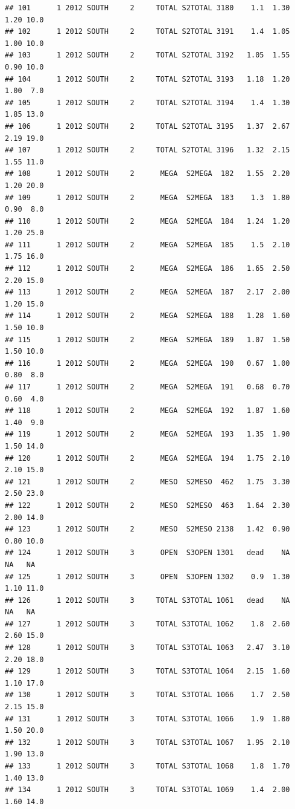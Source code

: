 \documentclass[
]{article}
\begin{document}
\begin{verbatim}
## 101      1 2012 SOUTH     2     TOTAL S2TOTAL 3180    1.1  1.30  1.20 10.0
## 102      1 2012 SOUTH     2     TOTAL S2TOTAL 3191    1.4  1.05  1.00 10.0
## 103      1 2012 SOUTH     2     TOTAL S2TOTAL 3192   1.05  1.55  0.90 10.0
## 104      1 2012 SOUTH     2     TOTAL S2TOTAL 3193   1.18  1.20  1.00  7.0
## 105      1 2012 SOUTH     2     TOTAL S2TOTAL 3194    1.4  1.30  1.85 13.0
## 106      1 2012 SOUTH     2     TOTAL S2TOTAL 3195   1.37  2.67  2.19 19.0
## 107      1 2012 SOUTH     2     TOTAL S2TOTAL 3196   1.32  2.15  1.55 11.0
## 108      1 2012 SOUTH     2      MEGA  S2MEGA  182   1.55  2.20  1.20 20.0
## 109      1 2012 SOUTH     2      MEGA  S2MEGA  183    1.3  1.80  0.90  8.0
## 110      1 2012 SOUTH     2      MEGA  S2MEGA  184   1.24  1.20  1.20 25.0
## 111      1 2012 SOUTH     2      MEGA  S2MEGA  185    1.5  2.10  1.75 16.0
## 112      1 2012 SOUTH     2      MEGA  S2MEGA  186   1.65  2.50  2.20 15.0
## 113      1 2012 SOUTH     2      MEGA  S2MEGA  187   2.17  2.00  1.20 15.0
## 114      1 2012 SOUTH     2      MEGA  S2MEGA  188   1.28  1.60  1.50 10.0
## 115      1 2012 SOUTH     2      MEGA  S2MEGA  189   1.07  1.50  1.50 10.0
## 116      1 2012 SOUTH     2      MEGA  S2MEGA  190   0.67  1.00  0.80  8.0
## 117      1 2012 SOUTH     2      MEGA  S2MEGA  191   0.68  0.70  0.60  4.0
## 118      1 2012 SOUTH     2      MEGA  S2MEGA  192   1.87  1.60  1.40  9.0
## 119      1 2012 SOUTH     2      MEGA  S2MEGA  193   1.35  1.90  1.50 14.0
## 120      1 2012 SOUTH     2      MEGA  S2MEGA  194   1.75  2.10  2.10 15.0
## 121      1 2012 SOUTH     2      MESO  S2MESO  462   1.75  3.30  2.50 23.0
## 122      1 2012 SOUTH     2      MESO  S2MESO  463   1.64  2.30  2.00 14.0
## 123      1 2012 SOUTH     2      MESO  S2MESO 2138   1.42  0.90  0.80 10.0
## 124      1 2012 SOUTH     3      OPEN  S3OPEN 1301   dead    NA    NA   NA
## 125      1 2012 SOUTH     3      OPEN  S3OPEN 1302    0.9  1.30  1.10 11.0
## 126      1 2012 SOUTH     3     TOTAL S3TOTAL 1061   dead    NA    NA   NA
## 127      1 2012 SOUTH     3     TOTAL S3TOTAL 1062    1.8  2.60  2.60 15.0
## 128      1 2012 SOUTH     3     TOTAL S3TOTAL 1063   2.47  3.10  2.20 18.0
## 129      1 2012 SOUTH     3     TOTAL S3TOTAL 1064   2.15  1.60  1.10 17.0
## 130      1 2012 SOUTH     3     TOTAL S3TOTAL 1066    1.7  2.50  2.15 15.0
## 131      1 2012 SOUTH     3     TOTAL S3TOTAL 1066    1.9  1.80  1.50 20.0
## 132      1 2012 SOUTH     3     TOTAL S3TOTAL 1067   1.95  2.10  1.90 13.0
## 133      1 2012 SOUTH     3     TOTAL S3TOTAL 1068    1.8  1.70  1.40 13.0
## 134      1 2012 SOUTH     3     TOTAL S3TOTAL 1069    1.4  2.00  1.60 14.0

\end{verbatim}
\end{document}
